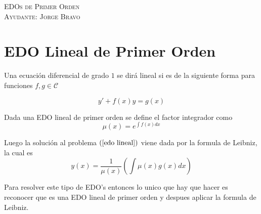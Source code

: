 \documentclass[a4paper,oneside,10.5pt]{article}
\begin{document}
\begin{center}
{\Large \textsc{EDOs de Primer Orden}}\\
\vspace{1em}
\textsc{Ayudante: Jorge Bravo}\\
\end{center}

\section*{EDO Lineal de Primer Orden}
Una ecuación diferencial de grado $1$ se dirá lineal si es de la siguiente forma para funciones $f,g \in \mathcal{C}$

\begin{equation}
  \label{edo lineal}
  y' + f(x)y = g(x)
\end{equation}

Dada una EDO lineal de primer orden se define el factor integrador como
\begin{equation*}
  \mu(x) = e^{\int f(x) dx}
\end{equation*}

Luego la solución al problema $(\ref{edo lineal})$ viene dada por la formula de Leibniz, la cual es
\begin{equation*}
  y(x) = \frac{1}{\mu(x)} (\int \mu(x) g(x) dx)
\end{equation*}

Para resolver este tipo de EDO's entonces lo unico que hay que hacer es reconocer que es una EDO lineal de primer orden y despues aplicar la formula de Leibniz.

\begin{ejemplo}

\end{ejemplo}
\end{document}

